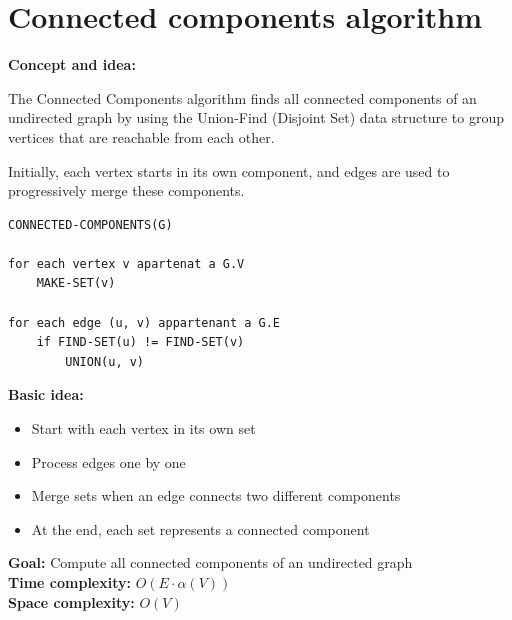 \documentclass[11pt,a4paper,openany]{book}
\begin{document}
\vspace{2cm}





\section{Connected components algorithm}



\textbf{Concept and idea:}

The Connected Components algorithm finds all connected components of an undirected graph by using the Union-Find (Disjoint Set) data structure to group vertices that are reachable from each other.

Initially, each vertex starts in its own component, and edges are used to progressively merge these components.

\begin{lstlisting}
CONNECTED-COMPONENTS(G)

for each vertex v apartenat a G.V
    MAKE-SET(v)

for each edge (u, v) appartenant a G.E
    if FIND-SET(u) != FIND-SET(v)
        UNION(u, v)

\end{lstlisting}

\textbf{Basic idea:}
\begin{itemize}
    \item Start with each vertex in its own set
    \item Process edges one by one
    \item Merge sets when an edge connects two different components
    \item At the end, each set represents a connected component
\end{itemize}

\textbf{Goal:} Compute all connected components of an undirected graph \\

\textbf{Time complexity:} $O(E \cdot \alpha(V))$ \\

\textbf{Space complexity:} $O(V)$
\end{document}
